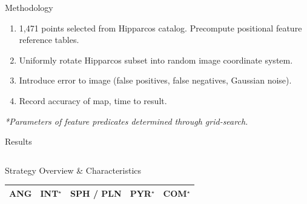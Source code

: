 \documentclass{beamer}
\newlength{\onecolwid}
\newlength{\twocolwid}
\begin{document}
\begin{frame}[t]
\begin{columns}[t]
\begin{column}{\twocolwid}
\begin{columns}[t,totalwidth=\twocolwid]
					\begin{column}{\onecolwid}\vspace{-.6in} %
						\begin{block}{Methodology}
							\begin{enumerate}
								\setlength\itemsep{1cm}
								\item \parbox{0.95\linewidth}{
									1{,}471 points selected from Hipparcos catalog. Precompute positional feature reference tables.
								}
								\item \parbox{0.95\linewidth}{
									Uniformly rotate Hipparcos subset into random image coordinate system.
								}
								\item \parbox{0.95\linewidth}{
									Introduce error to image (false positives, false negatives, Gaussian noise).
								}
								\item \parbox{0.95\linewidth}{
									Record accuracy of map, time to result.
								}
							\end{enumerate}
							\parbox{\linewidth}{\footnotesize{\textit{
								*Parameters of feature predicates determined through grid-search.
							}}}
						\end{block}
				
						\begin{block}{Results}
							
							\begin{figure}
								
								
								\vspace*{1cm}
								
								
							\end{figure}
						\end{block}
					\end{column}
				\end{columns}	
				
				\begin{block}{Strategy Overview \& Characteristics}
					\tdplotsetmaincoords{60}{110}
					\begin{table}
						\begin{tabularx}{\linewidth}[t]{XXXXX}
							{ANG} & {INT${}^{\star}$} & {SPH / PLN} & {PYR${}^{\star}$} & {COM${}^{\star}$} \\
							\midrule
							

\end{tabularx}
\end{table}
\end{block}
\end{column}
\end{columns}
\end{frame}
\end{document}
